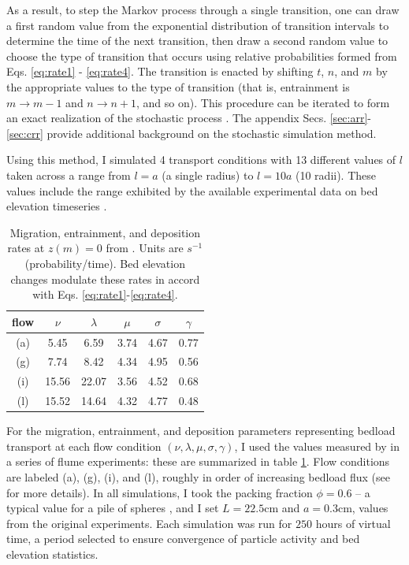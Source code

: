 As a result, to step the Markov process through a single transition, one can draw a first random value from the exponential distribution of transition intervals to determine the time of the next transition,
then draw a second random value to choose the type of transition that occurs using relative probabilities formed from Eqs. \ref{eq:rate1} - \ref{eq:rate4}. The transition is enacted by shifting $t$, $n$, and $m$ by the appropriate values to the type of transition (that is, entrainment is $m\rightarrow m-1$ and $n \rightarrow n+1$, and so on).
This procedure can be iterated to form an exact realization of the stochastic process \citep{Gillespie2007}.
The appendix Secs. \ref{sec:arr}-\ref{sec:crr} provide additional background on the stochastic simulation method.

Using this method, I simulated 4 transport conditions with 13 different values of $l$ taken across a range from $l=a$ (a single radius) to $l=10a$ (10 radii).
These values include the range exhibited by the available experimental data on bed elevation timeseries \citep{Wong2007,Singh2009,Martin2014}.

\begin{table}
	\caption{Migration, entrainment, and deposition rates at $z(m)=0$ from \citet{Ancey2008}. Units are $s^{-1}$ (probability/time). Bed elevation changes modulate these rates in accord with Eqs. \ref{eq:rate1}-\ref{eq:rate4}.}\label{tab:anceyparams}
	\begin{tabular}{cccccc} \\ 
		\toprule  
		flow & $\nu$ & $\lambda$ & $\mu$ & $\sigma$ & $\gamma$ \\
		\midrule
		(a) & 5.45  & 6.59  & 3.74 & 4.67 & 0.77 \\
		\midrule
		(g) & 7.74  & 8.42  & 4.34 & 4.95 & 0.56 \\
		\midrule
		(i) & 15.56 & 22.07 & 3.56 & 4.52 & 0.68 \\
		\midrule
		(l) & 15.52 & 14.64 & 4.32 & 4.77 & 0.48 \\
		\bottomrule
	\end{tabular}
\end{table}
For the migration, entrainment, and deposition parameters representing bedload transport at each flow condition $(\nu, \lambda, \mu, \sigma, \gamma)$, I used the values measured by \citet{Ancey2008} in a series of flume experiments: these are summarized in table \ref{tab:anceyparams}.
Flow conditions are labeled (a), (g), (i), and (l), roughly in order of increasing bedload flux (see \citet{Ancey2008} for more details). 
In all simulations, I took the packing fraction $\phi = 0.6$ -- a typical value for a pile of spheres \citep[e.g.][]{Bennett1972}, and I set $L = 22.5$cm and $a = 0.3$cm, values from the original \citet{Ancey2008} experiments.
Each simulation was run for $250$ hours of virtual time, a period selected to ensure convergence of particle activity and bed elevation statistics.

